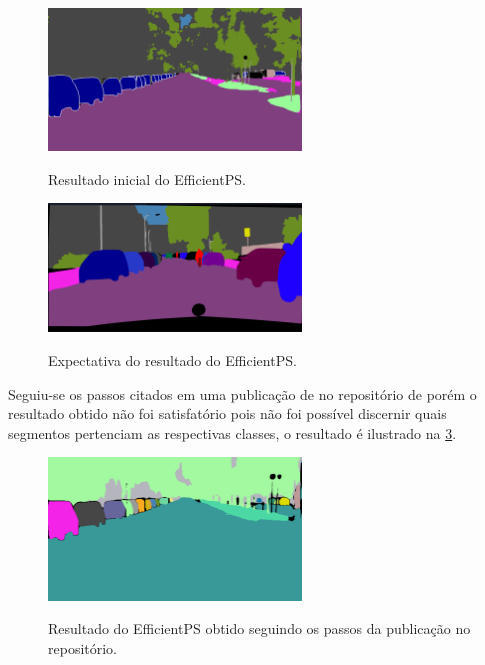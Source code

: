 \begin{figure}[!ht]
	\centering
    \caption{Resultado inicial do EfficientPS.}
	\includegraphics[width=0.6\textwidth]{figures/resultado_primario.png}
	\label{fig:resultado_inicial}
\end{figure}

\begin{figure}[!ht]
	\centering
    \caption{Expectativa do resultado do EfficientPS.}
	\includegraphics[width=0.6\textwidth]{figures/expectativa.png}
	\label{fig:expectativa}
\end{figure}

Seguiu-se os passos citados em uma publicação de  no repositório de  porém o resultado obtido não foi satisfatório pois não foi possível discernir quais segmentos pertenciam as respectivas classes, o resultado é ilustrado na \cref{fig:resultado_obtido}.

\begin{figure}[!ht]
	\centering
    \caption{Resultado do EfficientPS obtido seguindo os passos da publicação no repositório.}
	\includegraphics[width=0.6\textwidth]{figures/resultado_obtido.png}
	\label{fig:resultado_obtido}
\end{figure}

